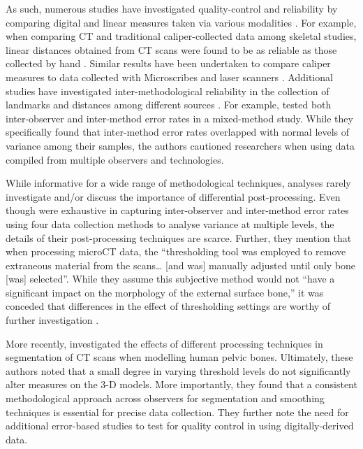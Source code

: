 \documentclass[review]{elsarticle}
\begin{document}
As such, numerous studies have investigated quality-control and reliability by comparing digital and linear measures taken via various modalities \citep{RN11474,RN11475,RN11476}. For example, when comparing CT and traditional caliper-collected data among skeletal studies, linear distances obtained from CT scans were found to be as reliable as those collected by hand \citep{RN5894,RN5893,RN5895,RN5896,zonn1989}. Similar results have been undertaken to compare caliper measures to data collected with Microscribes \citep{RN11487,RN11475} and laser scanners \citep{RN5886}. Additional studies have investigated inter-methodological reliability in the collection of landmarks and distances among different sources \citep{RN5879,RN5892,RN11522,RN5897,RN5901}. For example, \citet{RN11945} tested both inter-observer and inter-method error rates in a mixed-method study. While they specifically found that inter-method error rates overlapped with normal levels of variance among their samples, the authors cautioned researchers when using data compiled from multiple observers and technologies. 

While informative for a wide range of methodological techniques, analyses rarely investigate and/or discuss the importance of differential post-processing. Even though \citet[64]{RN11945} were exhaustive in capturing inter-observer and inter-method error rates using four data collection methods to analyse variance at multiple levels, the details of their post-processing techniques are scarce. Further, they mention that when processing microCT data, the “thresholding tool was employed to remove extraneous material from the scans… [and was] manually adjusted until only bone [was] selected”. While they assume this subjective method would not “have a significant impact on the morphology of the external surface bone,” it was conceded that differences in the effect of thresholding settings are worthy of further investigation \citep[64]{RN11945}.

More recently, \citet{RN8984} investigated the effects of different processing techniques in segmentation of CT scans when modelling human pelvic bones. Ultimately, these authors noted that a small degree in varying threshold levels do not significantly alter measures on the 3-D models. More importantly, they found that a consistent methodological approach across observers for segmentation and smoothing techniques is essential for precise data collection. They further note the need for additional error-based studies to test for quality control in using digitally-derived data.
\end{document}

